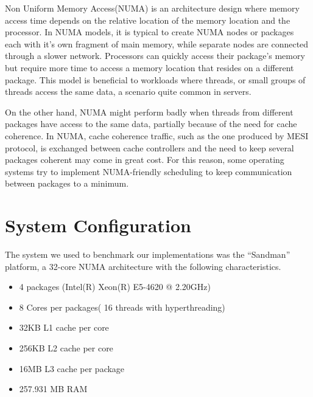 Non Uniform Memory Access(NUMA)  is an architecture design where memory access time depends on the relative location of the memory location and the processor. In NUMA models, it is typical to create NUMA nodes or packages each with it's own fragment of main memory, while separate nodes are connected through a slower network.  Processors can quickly access their package's memory but require more time to access a memory location that resides on a different package. This model is beneficial to workloads where threads, or small groups of threads access the same data, a scenario quite common in servers.

On the other hand, NUMA might perform badly when threads from different packages have access to the same data, partially because of the need for cache coherence. In NUMA, cache coherence traffic, such as the one produced by MESI protocol, is exchanged between cache controllers and the  need to keep several packages coherent may come in great cost. For this reason, some operating systems try to implement NUMA-friendly scheduling to keep communication between packages to a minimum.

\section{System Configuration}

The system we used to benchmark our implementations was the “Sandman” platform, a 32-core NUMA architecture with the following  characteristics.

\begin{itemize}
\item 4 packages (Intel(R) Xeon(R) E5-4620 @ 2.20GHz)
\item 8 Cores per packages( 16 threads with hyperthreading)
\item 32KB L1 cache per core
\item 256KB L2 cache per core
\item 16MB L3 cache per package
\item257.931 MB RAM 
\end{itemize}

